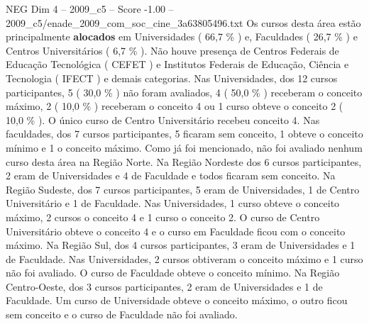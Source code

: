 \begin{textsample}{NEG Dim 4 – 2009\_c5 – Score -1.00 – 2009\_c5/enade\_2009\_com\_soc\_cine\_3a63805496.txt}
Os cursos desta área estão principalmente \textbf{alocados} em Universidades ( 66,7 \% ) e, Faculdades ( 26,7 \% ) e Centros Universitários ( 6,7 \% ).
Não houve presença de Centros Federais de Educação Tecnológica ( CEFET ) e Institutos Federais de Educação, Ciência e Tecnologia ( IFECT ) e demais categorias.
Nas Universidades, dos 12 cursos participantes, 5 ( 30,0 \% ) não foram avaliados, 4 ( 50,0 \% ) receberam o conceito máximo, 2 ( 10,0 \% ) receberam o conceito 4 ou 1 curso obteve o conceito 2 ( 10,0 \% ).
O único curso de Centro Universitário recebeu conceito 4.
Nas faculdades, dos 7 cursos participantes, 5 ficaram sem conceito, 1 obteve o conceito mínimo e 1 o conceito máximo.
Como já foi mencionado, não foi avaliado nenhum curso desta área na Região Norte.
Na Região Nordeste dos 6 cursos participantes, 2 eram de Universidades e 4 de Faculdade e todos ficaram sem conceito.
Na Região Sudeste, dos 7 cursos participantes, 5 eram de Universidades, 1 de Centro Universitário e 1 de Faculdade.
Nas Universidades, 1 curso obteve o conceito máximo, 2 cursos o conceito 4 e 1 curso o conceito 2.
O curso de Centro Universitário obteve o conceito 4 e o curso em Faculdade ficou com o conceito máximo.
Na Região Sul, dos 4 cursos participantes, 3 eram de Universidades e 1 de Faculdade.
Nas Universidades, 2 cursos obtiveram o conceito máximo e 1 curso não foi avaliado.
O curso de Faculdade obteve o conceito mínimo.
Na Região Centro-Oeste, dos 3 cursos participantes, 2 eram de Universidades e 1 de Faculdade.
Um curso de Universidade obteve o conceito máximo, o outro ficou sem conceito e o curso de Faculdade não foi avaliado.

\end{textsample}
